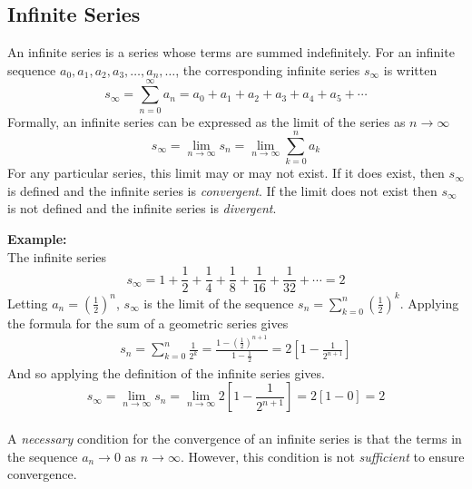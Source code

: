 
\pagebreak
\subsection*{Infinite Series}
An infinite series is a series whose terms are summed indefinitely. For an infinite sequence $a_0,a_1,a_2,a_3,\ldots,a_n,\ldots$, the corresponding infinite series $s_\infty$ is written
\begin{equation*}
  s_\infty=\sum_{n=0}^{\infty}a_n=a_0+a_1+a_2+a_3+a_4+a_5+\cdots
\end{equation*}
Formally, an infinite series can be expressed as the limit of the series as $n\to \infty$
\begin{equation*}
  s_\infty = \lim_{n \to \infty} s_n = \lim_{n \to \infty} \sum_{k=0}^n a_k 
\end{equation*}
For any particular series, this limit may or may not exist. If it does exist, then $s_\infty$ is defined and the infinite series is \emph{convergent}. If the limit does not exist then $s_\infty$ is not defined and the infinite series is \emph{divergent}.

\noindent  \textbf{Example:}\\
The infinite series
\begin{equation*}
  s_\infty = 1+\frac{1}{2}+\frac{1}{4}+\frac{1}{8}+\frac{1}{16}+\frac{1}{32}+\cdots = 2
\end{equation*}
Letting $a_n=\left(\frac{1}{2}\right)^n$, $s_\infty$ is the limit of the sequence $s_n=\sum_{k=0}^{n} \left(\frac{1}{2}\right)^k$. Applying the formula for the sum of a geometric series gives 
\begin{align*}
  s_n = \sum_{k=0}^{n} \frac{1}{2^k} = \frac{1- \left( \frac{1}{2} \right)^{n+1} }{1-\frac{1}{2}} = 2 \left[ 1-\frac{1}{2^{n+1}} \right]
\end{align*}
And so applying the definition of the infinite series gives.
\begin{equation*}
  s_\infty=\lim_{n \to \infty} s_n = \lim_{n \to \infty} 2 \left[ 1- \frac{1}{2^{n+1}} \right]= 2 \left[ 1-0 \right] = 2
\end{equation*}\\
A \emph{necessary} condition for the convergence of an infinite series is that the terms in the sequence $a_n \to 0$ as $n \to \infty$. However, this condition is not \emph{sufficient} to ensure convergence.


